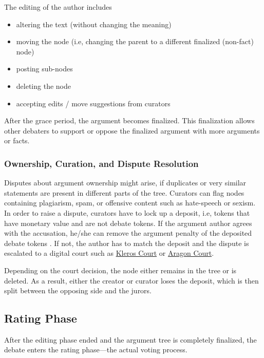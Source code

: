 \documentclass[%
aip,
amsmath,amssymb,
reprint,%
unsortedaddress,
nofootinbib
]{revtex4-2}
\begin{document}
The editing of the author includes 
\begin{itemize}[noitemsep]
	\item altering the text (without changing the meaning) %
	\item moving the node (i.e, changing the parent to a different finalized (non-fact) node)%
	\item posting sub-nodes
	\item deleting the node
	\item accepting edits / move suggestions from curators
\end{itemize}
After the grace period, the argument becomes finalized.
This finalization allows other debaters to support or oppose the finalized argument with more arguments or facts.


\subsubsection*{Ownership, Curation, and Dispute Resolution}
Disputes about argument ownership might arise, 
if duplicates or very similar statements are present in different parts of the tree.
Curators can flag nodes containing 
plagiarism, 
spam, or 
offensive content such as hate-speech or sexism. 
In order to raise a dispute, 
curators have to lock up a deposit, 
i.e, tokens that have monetary value and are not debate tokens. 
If the argument author agrees with the accusation, he/she can remove the argument  penalty of the deposited debate tokens . 
If not, the author has to match the deposit and the dispute is escalated to a digital court such as \href{https://kleros.io/}{Kleros Court}\cite{Lesaege2019,Lesaege2021} or \href{https://anj.aragon.org/}{Aragon Court}\cite{Cuende2019}.

Depending on the court decision, the node either remains in the tree or is deleted.
As a result, either the creator or curator loses the deposit, which is then split between the opposing side and the jurors. 


\subsection{Rating Phase}\label{sec:RatingPhase} %
After the editing phase ended and the argument tree is completely finalized,
the debate enters the rating phase---the actual voting process.
\end{document}
